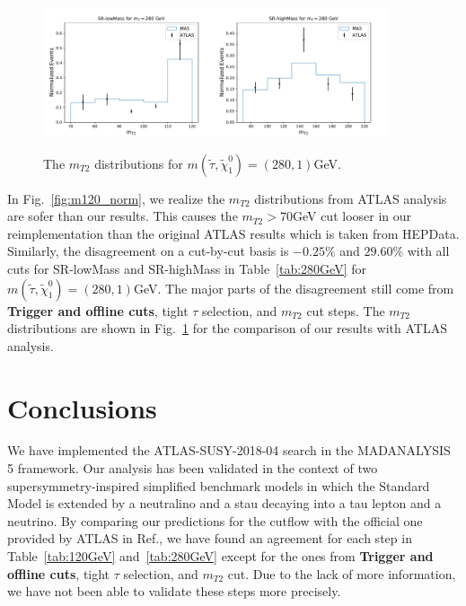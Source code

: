 \documentclass{ws-mpla}
\begin{document}
\begin{figure}[t]
  \centerline{\includegraphics[width=2.0in]{m280_norm_1}\includegraphics[width=2.0in]{m280_norm_2}}
  \vspace*{8pt}
  \caption{The $m_{T2}$ distributions for $m(\tilde{\tau},\tilde{\chi}^0_1)=(280,1) $GeV.\protect\label{fig:m280_norm}}
\end{figure}
In Fig.~\ref{fig:m120_norm}, we realize the $m_{T2}$ distributions from ATLAS analysis are sofer than our results. This causes the $m_{T2} > 70$GeV cut looser in our reimplementation than the original ATLAS results which is taken from HEPData. %
Similarly, the disagreement on a cut-by-cut basis is $-0.25\%$ and $29.60\%$ with all cuts for SR-lowMass and SR-highMass in Table~\ref{tab:280GeV} for $m(\tilde{\tau},\tilde{\chi}^0_1)=(280,1) $GeV. The major parts of the disagreement still come from  \textbf{Trigger and offline cuts}, tight $\tau$ selection, and $m_{T2}$ cut steps. 
The $m_{T2}$ distributions are shown in Fig.~\ref{fig:m280_norm} for the comparison of our results with ATLAS analysis. 


\section{Conclusions}

We have implemented the ATLAS-SUSY-2018-04 search in the MADANALYSIS 5 framework. Our analysis has been validated in the context of two supersymmetry-inspired simplified benchmark models in which the Standard Model is extended by a neutralino and a stau decaying into a tau lepton and a neutrino. 
By comparing our predictions for the cutflow with the official one provided by ATLAS in Ref.\cite{Aad:2019byo}, we have found an agreement for each step in Table~\ref{tab:120GeV} and~\ref{tab:280GeV} except for the ones from \textbf{Trigger and offline cuts}, tight $\tau$ selection, and $m_{T2}$ cut. Due to the lack of more information, we have not been able to validate these steps more precisely. 
\end{document}
